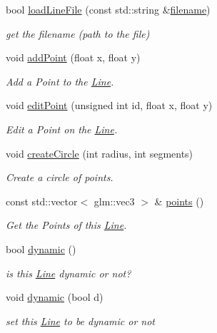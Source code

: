 \begin{DoxyCompactItemize}
bool \hyperlink{class_line_aa226221fdec140dc05536a0a7093e429}{load\+Line\+File} (const std\+::string \&\hyperlink{class_line_acc3089fd3ae6139e8900090bed9f5c4d}{filename})
\begin{DoxyCompactList}\small\item\em get the filename (path to the file) \end{DoxyCompactList}\item 
void \hyperlink{class_line_ac4b0054084c2ed06583fce888921aaae}{add\+Point} (float x, float y)
\begin{DoxyCompactList}\small\item\em Add a Point to the \hyperlink{class_line}{Line}. \end{DoxyCompactList}\item 
void \hyperlink{class_line_a9f0aac7a81375d4474eacec2667e59b4}{edit\+Point} (unsigned int id, float x, float y)
\begin{DoxyCompactList}\small\item\em Edit a Point on the \hyperlink{class_line}{Line}. \end{DoxyCompactList}\item 
void \hyperlink{class_line_a0cd9c7b2633e708869daaece09a2f941}{create\+Circle} (int radius, int segments)
\begin{DoxyCompactList}\small\item\em Create a circle of points. \end{DoxyCompactList}\item 
const std\+::vector$<$ glm\+::vec3 $>$ \& \hyperlink{class_line_a52f2f2f98db4f7f624e3f47f8b544244}{points} ()
\begin{DoxyCompactList}\small\item\em Get the Points of this \hyperlink{class_line}{Line}. \end{DoxyCompactList}\item 
bool \hyperlink{class_line_a28de742fe9c280abeeb39a6aae53a463}{dynamic} ()
\begin{DoxyCompactList}\small\item\em is this \hyperlink{class_line}{Line} dynamic or not? \end{DoxyCompactList}\item 
void \hyperlink{class_line_ad1014861d0d8663f2c44e4602f4b5d16}{dynamic} (bool d)
\begin{DoxyCompactList}\small\item\em set this \hyperlink{class_line}{Line} to be dynamic or not \end{DoxyCompactList}\item 

\end{DoxyCompactItemize}
